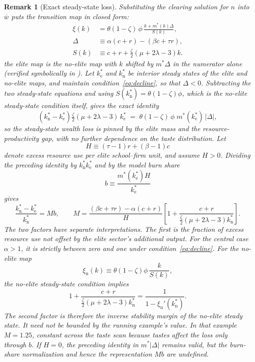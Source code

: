 \documentclass[12pt,letterpaper]{article}
\newtheorem{remark}{Remark}
\theoremstyle{definition}
\begin{document}
\begin{remark}[Exact steady-state loss]\label{rem:loss}
Substituting the clearing solution for $n$ into $\bar{w}$ puts the transition map in closed form:
\[
\begin{aligned}
\xi(k)
&=\theta(1-\zeta)\,\phi\,
\frac{k+m^\ast(k)\Delta}{S(k)},\\
\Delta
&\equiv\alpha(c+r)-(\beta c+\tau r),\\
S(k)
&\equiv c+r+\tfrac{\zeta}{2}(\mu+2\lambda-3)k.
\end{aligned}
\]
the elite map is the no-elite map with $k$ shifted by $m^\ast\Delta$ in the numerator alone (verified symbolically in ).
Let $k^\ast_{\mathrm{e}}$ and $k^\ast_{\mathrm{n}}$ be interior steady states of the elite and no-elite maps, and maintain condition~\eqref{eq:decline}, so that $\Delta<0$.
Subtracting the two steady-state equations and using $S(k^\ast_{\mathrm{n}})=\theta(1-\zeta)\phi$, which is the no-elite steady-state condition itself, gives the exact identity
\[
\left(k^\ast_{\mathrm{n}} - k^\ast_{\mathrm{e}}\right)\tfrac{\zeta}{2}(\mu+2\lambda-3)\,k^\ast_{\mathrm{e}}
\;=\;
\theta(1-\zeta)\,\phi\; m^\ast(k^\ast_{\mathrm{e}})\,\left|\Delta\right| ,
\]
so the steady-state wealth loss is pinned by the elite mass and the resource-productivity gap, with no further dependence on the taste distribution.
Let
\[
H\equiv(\tau-1)r+(\beta-1)c
\]
denote excess resource use per elite school--firm unit, and assume $H>0$.
Dividing the preceding identity by $k^\ast_{\mathrm{n}}k^\ast_{\mathrm{e}}$ and by the model burn share
\[
b\equiv
\frac{m^\ast(k^\ast_{\mathrm{e}})H}{k^\ast_{\mathrm{e}}}
\]
gives
\[
\frac{k^\ast_{\mathrm{n}}-k^\ast_{\mathrm{e}}}
     {k^\ast_{\mathrm{n}}}
=
M b,
\qquad
M
=
\frac{(\beta c+\tau r)-\alpha(c+r)}{H}
\left[
1+
\frac{c+r}
{\tfrac{\zeta}{2}(\mu+2\lambda-3)k^\ast_{\mathrm{n}}}
\right].
\]
The two factors have separate interpretations.
The first is the fraction of excess resource use not offset by the elite sector's additional output.
For the central case $\alpha>1$, it is strictly between zero and one under condition~\eqref{eq:decline}.
For the no-elite map
\[
\xi_{\mathrm{n}}(k)
\equiv
\theta(1-\zeta)\phi\,
\frac{k}{S(k)},
\]
the no-elite steady-state condition implies
\[
1+
\frac{c+r}
{\tfrac{\zeta}{2}(\mu+2\lambda-3)k^\ast_{\mathrm{n}}}
=
\frac{1}{1-\xi_{\mathrm{n}}'(k^\ast_{\mathrm{n}})}.
\]
The second factor is therefore the inverse stability margin of the no-elite steady state.
It need not be bounded by the running example's value.
In that example $M=1.25$, constant across the taste scan because tastes affect the loss only through $b$.
If $H=0$, the preceding identity in $m^\ast|\Delta|$ remains valid, but the burn-share normalization and hence the representation $Mb$ are undefined.
\end{remark}
\end{document}

